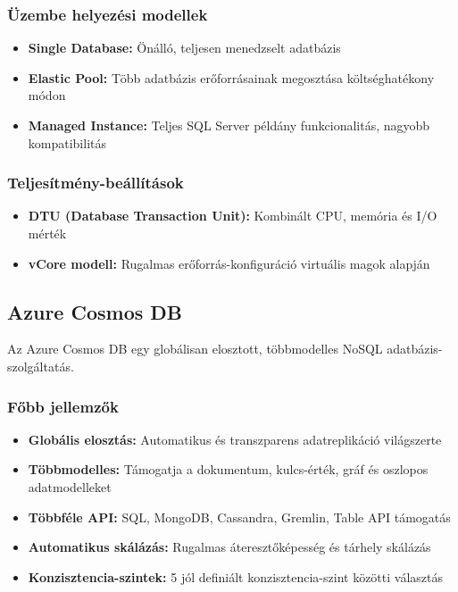 \documentclass[a4paper,12pt]{article}
\begin{document}
    \subsubsection{Üzembe helyezési modellek}

    \begin{itemize}
        \item \textbf{Single Database:} Önálló, teljesen menedzselt adatbázis
        \item \textbf{Elastic Pool:} Több adatbázis erőforrásainak megosztása költséghatékony módon
        \item \textbf{Managed Instance:} Teljes SQL Server példány funkcionalitás, nagyobb kompatibilitás
    \end{itemize}

    \subsubsection{Teljesítmény-beállítások}

    \begin{itemize}
        \item \textbf{DTU (Database Transaction Unit):} Kombinált CPU, memória és I/O mérték
        \item \textbf{vCore modell:} Rugalmas erőforrás-konfiguráció virtuális magok alapján
    \end{itemize}

    \subsection{Azure Cosmos DB}

    Az Azure Cosmos DB egy globálisan elosztott, többmodelles NoSQL adatbázis-szolgáltatás.

    \subsubsection{Főbb jellemzők}

    \begin{itemize}
        \item \textbf{Globális elosztás:} Automatikus és transzparens adatreplikáció világszerte
        \item \textbf{Többmodelles:} Támogatja a dokumentum, kulcs-érték, gráf és oszlopos adatmodelleket
        \item \textbf{Többféle API:} SQL, MongoDB, Cassandra, Gremlin, Table API támogatás
        \item \textbf{Automatikus skálázás:} Rugalmas áteresztőképesség és tárhely skálázás
        \item \textbf{Konzisztencia-szintek:} 5 jól definiált konzisztencia-szint közötti választás
    \end{itemize}
\end{document}
